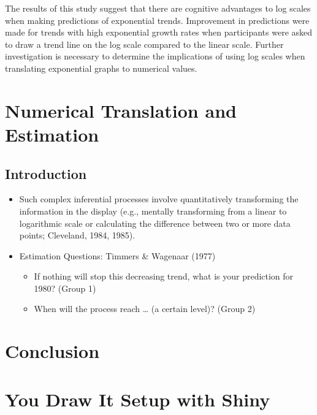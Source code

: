 \documentclass[print]{nuthesis}
\providecommand{\tightlist}{%
  \setlength{\itemsep}{0pt}\setlength{\parskip}{0pt}}
\begin{document}
The results of this study suggest that there are cognitive advantages to log scales when making predictions of exponential trends.
Improvement in predictions were made for trends with high exponential growth rates when participants were asked to draw a trend line on the log scale compared to the linear scale.
Further investigation is necessary to determine the implications of using log scales when translating exponential graphs to numerical values.

\hypertarget{estimation}{%
\chapter{Numerical Translation and Estimation}\label{estimation}}

\hypertarget{introduction-2}{%
\section{Introduction}\label{introduction-2}}

\begin{itemize}
\tightlist
\item
  Such complex inferential processes involve quantitatively transforming the information in the display (e.g., mentally transforming from a linear to logarithmic scale or calculating the difference between two or more data points; Cleveland, 1984, 1985).
\item
  Estimation Questions: Timmers \& Wagenaar (1977)

  \begin{itemize}
  \tightlist
  \item
    If nothing will stop this decreasing trend, what is your prediction for 1980? (Group 1)
  \item
    When will the process reach \ldots{} (a certain level)? (Group 2)
  \end{itemize}
\end{itemize}

\hypertarget{conclusion}{%
\chapter{Conclusion}\label{conclusion}}

\appendix

\hypertarget{youdrawit-with-shiny}{%
\chapter{You Draw It Setup with Shiny}\label{youdrawit-with-shiny}}
\end{document}

